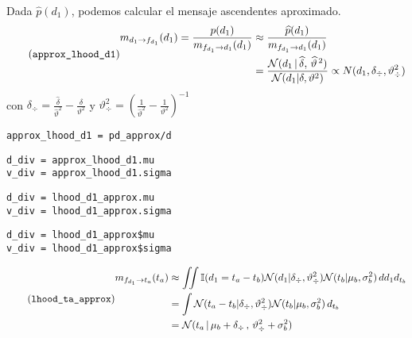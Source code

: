 \documentclass[article]{jss}
\newcommand{\N}{\mathcal{N}}
\begin{document}
Dada $\widehat{p}(d_1)$, podemos calcular el mensaje ascendentes aproximado.
%
\begin{equation}\label{eq:m^_d_fd} \tag{\texttt{approx\_lhood\_d1}}
\begin{split}
 m_{d_1 \rightarrow f_{d_1}}(d_1)   = \frac{p(d_1)}{m_{f_{d_1} \rightarrow d_1}(d_1)} 
 & \approx \frac{\widehat{p}(d_1)}{m_{f_{d_1} \rightarrow d_1}(d_1)}  \\
& = \frac{\N(d_1 \,  | \,\widehat{\delta} , \, \widehat{\vartheta}^{\,2} )}{\N(d_1 | \delta, \vartheta^2)} 
\propto N(d_1,\delta_{\div},\vartheta_{\div}^2 )
\end{split}
\end{equation}
%
con $\delta_{\div} = \frac{\widehat{\delta}}{\widehat{\vartheta}^2} - \frac{\delta}{\vartheta^2}$ y $\vartheta_{\div}^2 = (\frac{1}{\widehat{\vartheta}^2} - \frac{1}{\vartheta^2})^{-1}$ 
%
\begin{lstlisting}[backgroundcolor=\color{all},belowskip=-0.77 \baselineskip]
approx_lhood_d1 = pd_approx/d
\end{lstlisting}  
\begin{paracol}{3}
\begin{lstlisting}[backgroundcolor=\color{julia}]
d_div = approx_lhood_d1.mu
v_div = approx_lhood_d1.sigma
\end{lstlisting}
\switchcolumn
\begin{lstlisting}[backgroundcolor=\color{python}]
d_div = lhood_d1_approx.mu
v_div = lhood_d1_approx.sigma
\end{lstlisting}
\switchcolumn
\begin{lstlisting}[backgroundcolor=\color{r}]
d_div = lhood_d1_approx$mu
v_div = lhood_d1_approx$sigma
\end{lstlisting}
\end{paracol}
%
\begin{equation}\label{eq:^m_fd_ta} \tag{\texttt{lhood\_ta\_approx}}
\begin{split}
m_{f_{d_1} \rightarrow t_a}(t_a) & \approx  \iint \mathbb{I}(d_1 = t_a - t_b) \N(d_1 | \delta_{\div}, \vartheta_{\div}^2) \N(t_b | \mu_b , \sigma_b^2 )  \, d{d_1} d_{t_b} \\
& = \int  \N( t_a-t_b | \delta_{\div}, \vartheta_{\div}^2) \N(t_b | \mu_b , \sigma_b^2 )  \,  d_{t_b} \\
& = \N(t_a \, | \, \mu_b + \delta_{\div} \, , \, \vartheta_{\div}^2 + \sigma_b^2) \\
\end{split}
\end{equation}
\end{document}
